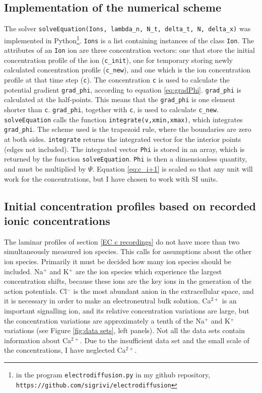 \documentclass{article}
\begin{document}
\subsection{Implementation of the numerical scheme}
The solver \texttt{solveEquation(Ions, lambda\_n, N\_t, delta\_t, N, delta\_x)} was implemented in Python\footnote{ in the program \texttt{electrodiffusion.py} in my github repository, \texttt{https://github.com/sigrivi/electrodiffusion}}.  \texttt{Ions} is a list containing instances of the class \texttt{Ion}. The attributes of an \texttt{Ion} ion are three concentration vectors: one that store the initial concentration profile of the ion (\texttt{c\_{init}}), one for temporary storing newly calculated concentration profile (\texttt{c\_{new}}), and one which is the ion concentration profile at that time step (\texttt{c}). The concentration \texttt{c} is used to calculate the potential gradient \texttt{grad\_phi}, according to equation \ref{eq:gradPhi}. \texttt{grad\_phi} is calculated at the half-points. This means that the \texttt{grad\_phi} is one element shorter than \texttt{c}. \texttt{grad\_{phi}}, together with \texttt{c}, is used to calculate \texttt{c\_new}. \texttt{solveEquation} calls the function \texttt{integrate(v,xmin,xmax)}, which integrates \texttt{grad\_phi}. The scheme used is the trapezoid rule, where the boundaries are zero at both sides. \texttt{integrate} returns the integrated vector for the interior points (edges not included). The integrated vector \texttt{Phi} is stored in an array, which is returned by the function \texttt{solveEquation}. \texttt{Phi} is then a dimensionless quantity, and must be multiplied by $\Psi$. Equation \ref{eq:c_i+1} is scaled so that any unit will work for the concentrations, but I have chosen to work with SI units. 

\subsection{Initial concentration profiles based on recorded ionic concentrations}\label{Initial concentration profiles}
The laminar profiles of section \ref{EC c recordings} do not have more than two simultaneously measured ion species. This calls for assumptions about the other ion species. Primarily it must be decided how many ion species should be included. Na$^+$ and K$^+$ are the ion species which experience the largest concentration shifts, because these ions are the key ions in the generation of the action potentials. Cl$^-$ is the most abundant anion in the extracellular space, and it is necessary in order to make an electroneutral bulk solution. Ca$^{2+}$ is an important signalling ion, and its relative concentration variations are large, but the concentration variations are approximately a tenth of the Na$^+$ and K$^+$ variations (see Figure \ref{fig:data sets}, left panels). Not all the data sets contain information about Ca$^{2+}$. Due to the insufficient data set and the small scale of the concentrations, I have neglected Ca$^{2+}$.  
\end{document}
